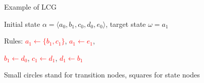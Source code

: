 \documentclass[8pt]{beamer}
\begin{document}


\begin{frame}{Example of LCG}

Initial state $\alpha=\langle a_0,b_1,c_0,d_0,e_0\rangle$, target state $\omega=a_1$
\vspace{0.5cm}


Rules: \textcolor<3,5,6>{red}{$a_1\gets \{b_1, c_1\}$}, 
\textcolor<2,4>{red}{$a_1\gets e_1$},

\textcolor<7>{red}{$b_1\gets d_0$}, 
\textcolor<8>{red}{$c_1\gets d_1$}, 
\textcolor<10>{red}{$d_1\gets b_1$}

\vspace{0.5cm}

\begin{figure}



\end{figure}
Small circles stand for transition nodes, squares for state nodes

\end{frame}
\end{document}
